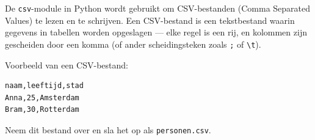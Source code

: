 De \texttt{csv}-module in Python wordt gebruikt om CSV-bestanden (Comma Separated Values) te lezen en te schrijven. 
Een CSV-bestand is een tekstbestand waarin gegevens in tabellen worden opgeslagen — elke regel is een rij, 
en kolommen zijn gescheiden door een komma (of ander scheidingsteken zoals \texttt{;} of \texttt{\textbackslash t}).

Voorbeeld van een CSV-bestand:
\begin{lstlisting}[language={},frame=single]
naam,leeftijd,stad
Anna,25,Amsterdam
Bram,30,Rotterdam
\end{lstlisting}

Neem dit bestand over en sla het op als \texttt{personen.csv}.

